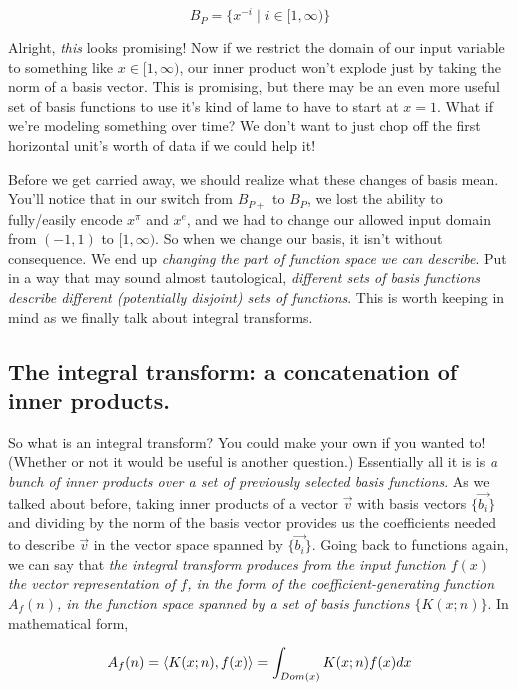 \documentclass[letterpaper,12pt]{report}
\begin{document}
\[B_{P} = \{x^{-i} \mid i \in [1, \infty)\} \] 

Alright, \emph{this} looks promising! Now if we restrict
the domain of our input variable to 
something like \(x \in [1, \infty)\),
our inner product
won't explode just by taking the norm of a basis vector.
This is promising, but there may be an even more useful
set of basis functions to use \textemdash{} it's kind of
lame to have to start at \(x=1\). What if we're modeling
something over time? We don't want to just chop
off the first horizontal unit's worth of data if we 
could help it! \par

Before we get carried away, we should realize what these
changes of basis mean. You'll notice that in our switch
from \(B_{P+}\) to \(B_{P}\), we lost the ability to
fully/easily encode \(x^\pi\) and \(x^e\), and we
had to change our allowed input domain from \((-1,1)\)
to \([1, \infty)\). So when we change our basis, it
isn't without consequence. We end up
\emph{changing the part of function space we can describe}. 
Put in a way that may sound almost tautological,
\emph{different sets of basis functions
describe different (potentially disjoint) sets of functions}.
This is worth keeping in mind as we finally talk about
integral transforms.

\subsection{The integral transform: a concatenation of inner products.}

So what is an integral transform?
You could make your own if you wanted to!
(Whether or not it would be useful is another question.)
Essentially all it is is \emph{a bunch of inner products
over a set of previously selected basis functions}.
As we talked about before, taking inner products of
a vector \(\vec{v}\)
with basis vectors \(\{\vec{b_i}\}\)
and dividing by the norm of the basis vector
provides us the coefficients needed to describe \(\vec{v}\)
in the vector space spanned by \(\{\vec{b_i}\}\).
Going back to functions again, 
we can say that \emph{the integral transform
produces from the input function \(f(x)\)
the vector representation of \(f\),
in the form of the coefficient-generating function \(A_f(n)\),
in the function space spanned by a set of basis functions
\(\{K(x;n)\}\)}. In mathematical form,

\[A_f(n) = \innerprod[K(x;n)][f(x)] 
  = \int_{Dom(x)} K(x;n) f(x) dx \]
\end{document}
